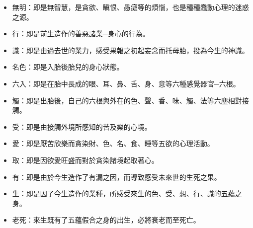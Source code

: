 \begin{itemize}
  \item 無明：即是無智慧，是貪欲、瞋恨、愚癡等的煩惱，也是種種蠢動心理的迷惑之源。
  \item 行：即是前生造作的善惡諸業─身心的行為。
  \item 識：即是由過去世的業力，感受果報之初起妄念而托母胎，投為今生的神識。
  \item 名色：即是入胎後胎兒的身心狀態。
  \item 六入：即是在胎中長成的眼、耳、鼻、舌、身、意等六種感覺器官─六根。
  \item 觸：即是出胎後，自己的六根與外在的色、聲、香、味、觸、法等六塵相對接觸。
  \item 受：即是由接觸外境所感知的苦及樂的心境。
  \item 愛：即是厭苦欣樂而貪染財、色、名、食、睡等五欲的心理活動。
  \item 取：即是因欲愛旺盛而對於貪染諸境起取著心。
  \item 有：即是由於今生造作了有漏之因，而導致感受未來世的生死之果。
  \item 生：即是因了今生造作的業種，所感受來生的色、受、想、行、識的五蘊之身。
  \item 老死：來生既有了五蘊假合之身的出生，必將衰老而至死亡。
\end{itemize}
